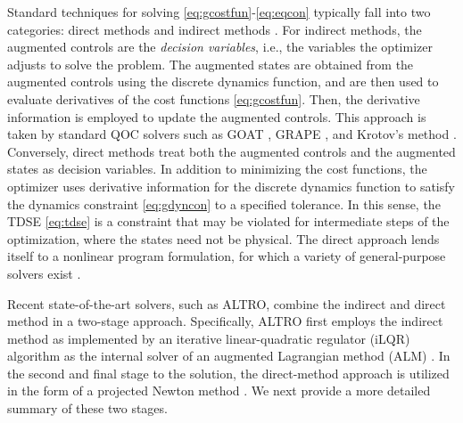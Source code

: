 Standard techniques for solving \eqref{eq:gcostfun}-\eqref{eq:eqcon} typically
fall into two categories: direct methods \cite{Hargraves87, kelly2017introduction}
and indirect methods \cite{betts1998survey}. For indirect methods,
the augmented controls are the \emph{decision variables}, i.e., the
variables the optimizer adjusts to solve the problem.
The augmented states are obtained from the augmented controls using the discrete dynamics function,
and are then used to evaluate derivatives of the cost functions \eqref{eq:gcostfun}.
Then, the derivative information is employed to update the augmented controls.
This approach is taken by standard QOC solvers such as GOAT \cite{machnes2015tunable},
GRAPE \cite{khaneja2005optimal, leung2017speedup}, and Krotov's method \cite{goerz2019krotov}.
Conversely, direct methods treat both the augmented controls and the augmented states as decision
variables. In addition to minimizing the cost functions, the optimizer uses derivative information
for the discrete dynamics function
to satisfy the dynamics constraint \eqref{eq:gdyncon} to a specified tolerance.
In this sense, the TDSE \eqref{eq:tdse} is a constraint that may be violated
for intermediate steps of the optimization, where the states need not be physical.
The direct approach lends itself to a nonlinear program formulation, for which
a variety of general-purpose solvers exist \cite{gill2005snopt, wachter2006implementation}.


Recent state-of-the-art solvers, such as ALTRO,
 combine the indirect and direct method in a two-stage approach.  Specifically, ALTRO first employs the indirect method as implemented by an
iterative linear-quadratic regulator (iLQR) algorithm
\cite{Li2004a} as the internal solver of an augmented Lagrangian method (ALM)
\cite{lantoine2012hybrid, plancher2017constrained, nocedal2006numerical}. In the second and final stage to the solution, the direct-method approach is utilized in the form of a projected Newton method \cite{bertsekas1982projected, rao1998application}. We next provide a more detailed summary of these two stages.

